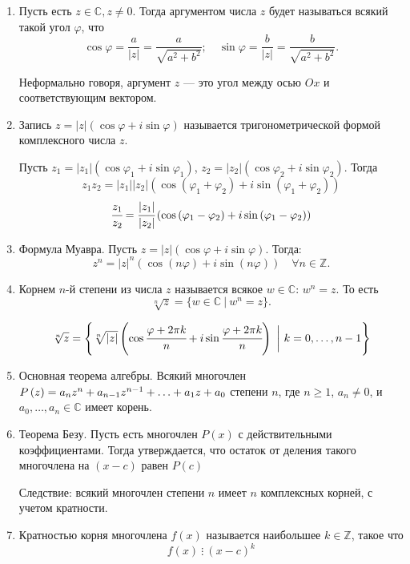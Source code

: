 \documentclass[a4paper,12pt]{article}
\newcommand*{\hm}[1]{#1\nobreak\discretionary{}
	{\hbox{$\mathsurround=0pt #1$}}{}}
\newcommand{\Z}{\mathbb{Z}}
\renewcommand{\C}{\mathbb{C}}
\begin{document}
\begin{enumerate}
		
		\item Пусть есть $z \in \C, z \ne 0$. Тогда аргументом числа $z$ будет называться всякий такой угол $\varphi$, что
		\[
		\cos \varphi = \frac{a}{|z|} = \frac{a}{\sqrt{a^2 + b^2}}; \quad \sin \varphi = \frac{b}{|z|} = \frac{b}{\sqrt{a^2 + b^2}}.
		\]
		
		Неформально говоря, аргумент $z$ — это угол между осью $Ox$ и соответствующим вектором.
		\item Запись $z = |z|(\cos\varphi + i\sin\varphi)$ называется тригонометрической формой комплексного числа $z$.
		
		Пусть $z_1 = |z_1|\left(\cos{\varphi_1}+i\sin{\varphi_1}\right)$, $z_2 = |z_2|\left(\cos{\varphi_2} + i\sin{\varphi_2}\right)$. Тогда 
		\[
		z_1z_2 = |z_1||z_2|\left(\cos\left(\varphi_1 + \varphi_2\right) + i\sin\left(\varphi_1 + \varphi_2\right)\right)
		\]
		\[\cfrac{z_1}{z_2} = \cfrac{|z_1|}{|z_2|}\left(\cos\left(\varphi_1-\varphi_2\right) + i\sin\left(\varphi_1 - \varphi_2\right)\right)\]
		
		\item Формула Муавра. Пусть $z = |z|\left(\cos\varphi + i \sin \varphi\right)$. Тогда:
		\[z^n = |z|^n\left(\cos\left(n\varphi\right)+i\sin\left(n\varphi\right)\right) \quad \forall n \in \mathbb{Z}.
		\]
		
		\item 	Корнем $n$-й степени из числа $z$ называется всякое $w\in\mathbb C$: $w^n=z$. То есть
		\[
		\sqrt[n]{z} = \{w\in\mathbb C\ |\ w^n = z\}.
		\]
		
		\[ \sqrt[n]{z} = \Biggl\{\sqrt[n]{|z|}\left(\cos\cfrac{\varphi+2\pi k}{n}+i\sin\cfrac{\varphi+2\pi k }{n}\right)\ \biggl|\ k=0,\ldots,n-1\Biggr\}
		\]
		
		\item Основная теорема алгебры. Всякий многочлен $P\left(z\right) = a_nz^n + a_{n-1}z^{n-1} + \ldots \hm{+} a_1z + a_0$ степени $n$, где $n \geqslant 1$, $a_n \neq 0$, и $a_0,\ldots,a_n \in \mathbb{C}$ имеет корень.
		
		\item Теорема Безу. Пусть есть многочлен $P(x)$ с действительными коэффициентами. Тогда утверждается, что остаток от деления такого многочлена на $(x - c)$ равен $P(c)$
		
		Следствие: всякий многочлен степени $n$ имеет $n$ комплексных корней, с учетом кратности.
		
		\item Кратностью корня многочлена $f(x)$ называется наибольшее $k \in \Z$, такое что
		\[
		f(x) \ \vdots \ (x - c)^k
		\]
		

\end{enumerate}
\end{document}
